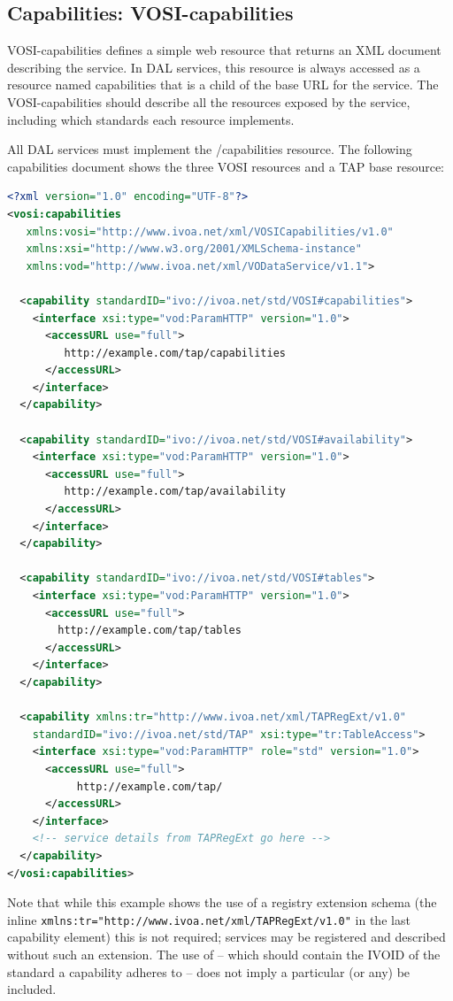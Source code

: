 \documentclass[11pt,letter]{ivoa}
\begin{document}
\subsection{Capabilities: VOSI-capabilities}
\label{sec:vosi-capabilities}
VOSI-capabilities \citep{std:VOSI} defines a simple web resource that 
returns an XML document 
describing the service. In  DAL services, this resource is always accessed as a 
resource named capabilities that is a child of the base URL for the service. The 
VOSI-capabilities should describe all the resources exposed by the service, 
including which standards each resource implements.

All DAL services must implement the /capabilities resource. The following 
capabilities document shows the three VOSI resources and a TAP base resource: 

\begin{lstlisting}[language=XML,basicstyle=\footnotesize]
<?xml version="1.0" encoding="UTF-8"?>
<vosi:capabilities
   xmlns:vosi="http://www.ivoa.net/xml/VOSICapabilities/v1.0"
   xmlns:xsi="http://www.w3.org/2001/XMLSchema-instance"
   xmlns:vod="http://www.ivoa.net/xml/VODataService/v1.1">

  <capability standardID="ivo://ivoa.net/std/VOSI#capabilities">
    <interface xsi:type="vod:ParamHTTP" version="1.0">
      <accessURL use="full">
         http://example.com/tap/capabilities
      </accessURL>
    </interface>
  </capability>

  <capability standardID="ivo://ivoa.net/std/VOSI#availability">
    <interface xsi:type="vod:ParamHTTP" version="1.0">
      <accessURL use="full">
         http://example.com/tap/availability
      </accessURL>
    </interface>
  </capability>

  <capability standardID="ivo://ivoa.net/std/VOSI#tables">
    <interface xsi:type="vod:ParamHTTP" version="1.0">
      <accessURL use="full">
        http://example.com/tap/tables
      </accessURL>
    </interface>
  </capability>

  <capability xmlns:tr="http://www.ivoa.net/xml/TAPRegExt/v1.0"
    standardID="ivo://ivoa.net/std/TAP" xsi:type="tr:TableAccess">
    <interface xsi:type="vod:ParamHTTP" role="std" version="1.0">
      <accessURL use="full">
           http://example.com/tap/
      </accessURL>
    </interface>
    <!-- service details from TAPRegExt go here -->
  </capability>
</vosi:capabilities>
\end{lstlisting}

Note that while this example shows the use of a registry extension schema (the 
inline \verb|xmlns:tr="http://www.ivoa.net/xml/TAPRegExt/v1.0"| in the last capability 
element) this is not required; services may be registered and described without 
such an extension. The use of  -- which should contain the
IVOID of 
the standard a capability adheres to -- does not imply a particular (or any) 
 be included.
\end{document}
